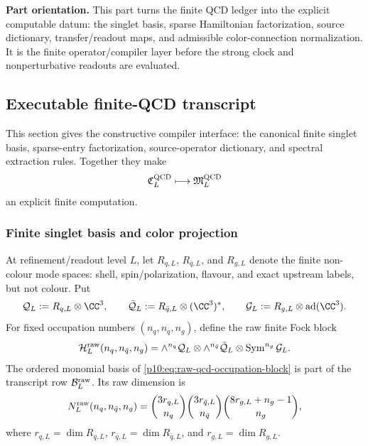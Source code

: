 \documentclass[12pt,a4paper]{article}
\begin{document}
\label{p10:part:finite-color-executable-transcript}


\noindent\textbf{Part orientation.}
This part turns the finite QCD ledger into the explicit computable datum: the singlet basis, sparse Hamiltonian factorization, source dictionary, transfer/readout maps, and admissible color-connection normalization.  It is the finite operator/compiler layer before the strong clock and nonperturbative readouts are evaluated.


\subsection{Executable finite-QCD transcript}
\label{p10:sec:executable-finite-qcd-transcript}

This section gives the constructive compiler interface: the canonical finite
singlet basis, sparse-entry factorization, source-operator dictionary, and
spectral extraction rules.  Together they make
\[
\mathfrak C_L^{\rm QCD}\longmapsto\mathfrak M_L^{\rm QCD}
\]
an explicit finite computation.


\subsubsection{Finite singlet basis and color projection}
\label{p10:subsec:finite-singlet-basis-transcript}

At refinement/readout level \(L\), let \(R_{q,L}\), \(R_{\bar q,L}\), and \(R_{g,L}\) denote the finite non-colour mode spaces: shell, spin/polarization, flavour, and exact upstream labels, but not colour.  Put
\[
\mathcal Q_L:=R_{q,L}\otimes \CC^3,
\qquad
\bar{\mathcal Q}_L:=R_{\bar q,L}\otimes (\CC^3)^*,
\qquad
\mathcal G_L:=R_{g,L}\otimes {\rm ad}(\CC^3).
\]
For fixed occupation numbers \((n_q,n_{\bar q},n_g)\), define the raw finite Fock block
\begin{equation}
\label{p10:eq:raw-qcd-occupation-block}
\mathcal H_{L}^{\rm raw}(n_q,n_{\bar q},n_g)
=
\wedge^{n_q}\mathcal Q_L
\otimes
\wedge^{n_{\bar q}}\bar{\mathcal Q}_L
\otimes
\operatorname{Sym}^{n_g}\mathcal G_L .
\end{equation}
The ordered monomial basis of \eqref{p10:eq:raw-qcd-occupation-block} is part of the transcript row \(\mathcal B_L^{\rm raw}\).  Its raw dimension is
\begin{equation}
\label{p10:eq:raw-qcd-occupation-dimension}
N_L^{\rm raw}(n_q,n_{\bar q},n_g)
=
\binom{3r_{q,L}}{n_q}
\binom{3r_{\bar q,L}}{n_{\bar q}}
\binom{8r_{g,L}+n_g-1}{n_g},
\end{equation}
where \(r_{q,L}=\dim R_{q,L}\), \(r_{\bar q,L}=\dim R_{\bar q,L}\), and \(r_{g,L}=\dim R_{g,L}\).
\end{document}
